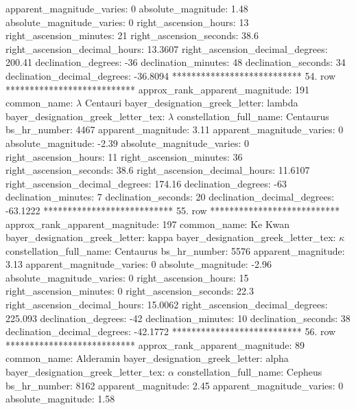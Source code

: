          apparent_magnitude_varies: 0
                absolute_magnitude: 1.48
         absolute_magnitude_varies: 0
             right_ascension_hours: 13
           right_ascension_minutes: 21
           right_ascension_seconds: 38.6
     right_ascension_decimal_hours: 13.3607
   right_ascension_decimal_degrees: 200.41
               declination_degrees: -36
               declination_minutes: 48
               declination_seconds: 34
       declination_decimal_degrees: -36.8094
*************************** 54. row ***************************
    approx_rank_apparent_magnitude: 191
                       common_name: $\lambda$ Centauri
    bayer_designation_greek_letter: lambda
bayer_designation_greek_letter_tex: $\lambda$
           constellation_full_name: Centaurus
                      bs_hr_number: 4467
                apparent_magnitude: 3.11
         apparent_magnitude_varies: 0
                absolute_magnitude: -2.39
         absolute_magnitude_varies: 0
             right_ascension_hours: 11
           right_ascension_minutes: 36
           right_ascension_seconds: 38.6
     right_ascension_decimal_hours: 11.6107
   right_ascension_decimal_degrees: 174.16
               declination_degrees: -63
               declination_minutes: 7
               declination_seconds: 20
       declination_decimal_degrees: -63.1222
*************************** 55. row ***************************
    approx_rank_apparent_magnitude: 197
                       common_name: Ke Kwan
    bayer_designation_greek_letter: kappa
bayer_designation_greek_letter_tex: $\kappa$
           constellation_full_name: Centaurus
                      bs_hr_number: 5576
                apparent_magnitude: 3.13
         apparent_magnitude_varies: 0
                absolute_magnitude: -2.96
         absolute_magnitude_varies: 0
             right_ascension_hours: 15
           right_ascension_minutes: 0
           right_ascension_seconds: 22.3
     right_ascension_decimal_hours: 15.0062
   right_ascension_decimal_degrees: 225.093
               declination_degrees: -42
               declination_minutes: 10
               declination_seconds: 38
       declination_decimal_degrees: -42.1772
*************************** 56. row ***************************
    approx_rank_apparent_magnitude: 89
                       common_name: Alderamin
    bayer_designation_greek_letter: alpha
bayer_designation_greek_letter_tex: $\alpha$
           constellation_full_name: Cepheus
                      bs_hr_number: 8162
                apparent_magnitude: 2.45
         apparent_magnitude_varies: 0
                absolute_magnitude: 1.58
